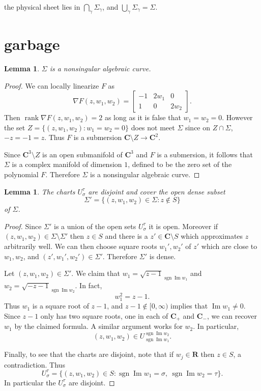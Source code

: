 \documentclass[reqno,12pt,letterpaper]{amsart}
\newcommand{\RR}{\mathbf{R}}
\newcommand{\CC}{\mathbf{C}}
\DeclareMathOperator{\rank}{rank}
\DeclareMathOperator{\sgn}{sgn}
\renewcommand{\Im}{\operatorname{Im}}
\newtheorem{lemma}[theorem]{Lemma}
\theoremstyle{definition}
\begin{document}
the physical sheet lies in $\bigcap_\gamma \Sigma_\gamma$, and $\bigcup_\gamma \Sigma_\gamma = \Sigma$.










\section{garbage}
\begin{lemma}
$\Sigma$ is a nonsingular algebraic curve.
\end{lemma}
\begin{proof}
We can locally linearize $F$ as
$$\nabla F(z, w_1, w_2) = \begin{bmatrix}-1 & 2w_1 & 0\\1 & 0 & 2w_2\end{bmatrix}.$$
Then $\rank \nabla F(z, w_1, w_2) = 2$ as long as it is false that $w_1 = w_2 = 0$.
However the set $Z = \{(z, w_1, w_2): w_1 = w_2 = 0\}$ does not meet $\Sigma$ since on $Z \cap \Sigma$, $-z = -1 = z$.
Thus $F$ is a submersion $\CC \setminus Z \to \CC^2$.

Since $\CC^3 \setminus Z$ is an open submanifold of $\CC^3$ and $F$ is a submersion, it follows that $\Sigma$ is a complex manifold of dimension $1$, defined to be the zero set of the polynomial $F$.
Therefore $\Sigma$ is a nonsingular algebraic curve.
\end{proof}
\begin{lemma}
The charts $U_\sigma^\tau$ are disjoint and cover the open dense subset
$$\Sigma' = \{(z, w_1, w_2) \in \Sigma: z \notin S\}$$
of $\Sigma$.
\end{lemma}
\begin{proof}
Since $\Sigma'$ is a union of the open sets $U_\sigma^\tau$ it is open. Moreover if $(z, w_1, w_2) \in \Sigma \setminus \Sigma'$ then $z \in S$ and there is a $z' \in \CC \setminus S$ which approximates $z$ arbitrarily well. We can then choose square roots $w_1',w_2'$ of $z'$ which are close to $w_1,w_2$, and $(z', w_1', w_2') \in \Sigma'$. Therefore $\Sigma'$ is dense.

Let $(z, w_1, w_2) \in \Sigma'$. We claim that $w_1 = \sqrt{z-1}_{\sgn \Im w_1}$ and $w_2 = \sqrt{-z-1}_{\sgn \Im w_2}$.
In fact,
$$w_1^2 = z - 1.$$
Thus $w_1$ is a square root of $z - 1$, and $z - 1 \notin [0, \infty)$ implies that $\Im w_1 \neq 0$.
Since $z - 1$ only has two square roots, one in each of $\CC_+$ and $\CC_-$, we can recover $w_1$ by the claimed formula.
A similar argument works for $w_2$.
In particular,
$$(z, w_1, w_2) \in U_{\sgn \Im w_1}^{\sgn \Im w_2}.$$

Finally, to see that the charts are disjoint, note that if $w_j \in \RR$ then $z \in S$, a contradiction. Thus
$$U_\sigma^\tau = \{(z, w_1, w_2) \in S: \sgn \Im w_1 = \sigma,~\sgn \Im w_2 = \tau\}.$$
In particular the $U_\sigma^\tau$ are disjoint.
\end{proof}
\end{document}

